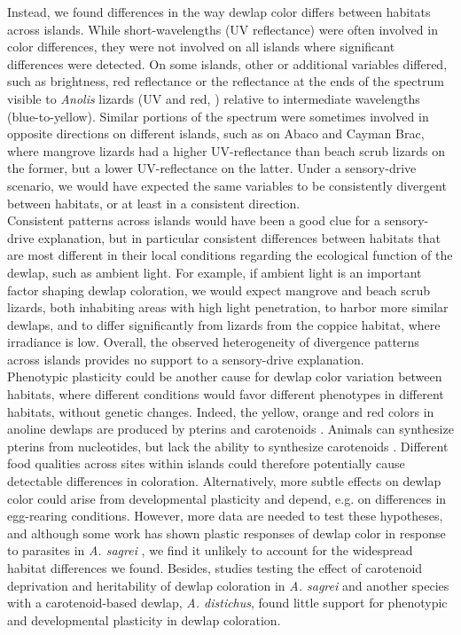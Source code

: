 Instead, we found differences in the way dewlap color differs between habitats across islands. While short-wavelengths (UV reflectance) were often involved in color differences, they were not involved on all islands where significant differences were detected. On some islands, other or additional variables differed, such as brightness, red reflectance or the reflectance at the ends of the spectrum visible to \textit{Anolis} lizards (UV and red, \citealt{Lazareva2012}) relative to intermediate wavelengths (blue-to-yellow). Similar portions of the spectrum were sometimes involved in opposite directions on different islands, such as on Abaco and Cayman Brac, where mangrove lizards had a higher UV-reflectance than beach scrub lizards on the former, but a lower UV-reflectance on the latter. Under a sensory-drive scenario, we would have expected the same variables to be consistently divergent between habitats, or at least in a consistent direction.\\

Consistent patterns across islands would have been a good clue for a sensory-drive explanation, but in particular consistent differences between habitats that are most different in their local conditions regarding the ecological function of the dewlap, such as ambient light. For example, if ambient light is an important factor shaping dewlap coloration, we would expect mangrove and beach scrub lizards, both inhabiting areas with high light penetration, to harbor more similar dewlaps, and to differ significantly from lizards from the coppice habitat, where irradiance is low. Overall, the observed heterogeneity of divergence patterns across islands provides no support to a sensory-drive explanation.\\

Phenotypic plasticity could be another cause for dewlap color variation between habitats, where different conditions would favor different phenotypes in different habitats, without genetic changes. Indeed, the yellow, orange and red colors in anoline dewlaps are produced by pterins and carotenoids \citep{Ortiz1962, Ortiz1962a, Ortiz1963, Ortiz1966, Macedonia2000, Steffen2007, Steffen2009}. Animals can synthesize pterins from nucleotides, but lack the ability to synthesize carotenoids \citep{Goodwin1984, Hill2002, Hill2006}. Different food qualities across sites within islands could therefore potentially cause detectable differences in coloration. Alternatively, more subtle effects on dewlap color could arise from developmental plasticity and depend, e.g. on differences in egg-rearing conditions. However, more data are needed to test these hypotheses, and although some work has shown plastic responses of dewlap color in response to parasites in \textit{A. sagrei} \citep{Cook2013}, we find it unlikely to account for the widespread habitat differences we found. Besides, studies testing the effect of carotenoid deprivation \citep{Steffen2010, Ng2013} and heritability \citep{Cox2017} of dewlap coloration in \textit{A. sagrei} and another species with a carotenoid-based dewlap, \textit{A. distichus}, found little support for phenotypic and developmental plasticity in dewlap coloration.\\

